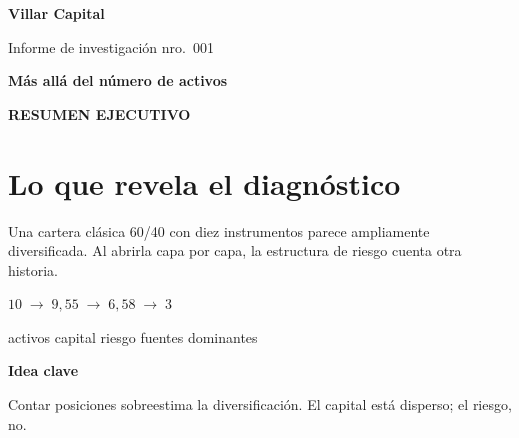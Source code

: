\documentclass[11pt,letterpaper]{article}
\newcommand{\kicker}[1]{%
  {\sffamily\small\bfseries\color{Navy}\MakeUppercase{#1}}\par\vspace{0.35em}%
}
\newcommand{\insight}[1]{%
  \vspace{0.35em}%
  \noindent\colorbox{Soft}{%
    \parbox{\dimexpr\textwidth-2\fboxsep-1pt\relax}{%
      \vspace{0.45em}%
      {\sffamily\bfseries\color{Navy} Idea clave}\par\vspace{0.2em}%
      {\large\color{Ink}#1}%
      \vspace{0.4em}%
    }%
  }\par\vspace{0.4em}%
}
\begin{document}
\begin{titlepage}
\thispagestyle{empty}

\vfill

\begin{center}
{\sffamily\Large\bfseries\color{Navy} Villar Capital}

\vspace{1.1em}
{\sffamily\small\color{Muted} Informe de investigación nro.\ 001}

\vspace{2.8em}
{\fontsize{30}{36}\selectfont\bfseries\color{Ink}%
Más allá del número de activos\par}
\end{center}

\vfill

\noindent{\color{Navy}\rule{\textwidth}{2.5pt}}
\end{titlepage}

\newpage
\kicker{Resumen ejecutivo}
\section*{Lo que revela el diagnóstico}

Una cartera clásica 60/40 con diez instrumentos parece ampliamente diversificada.
Al abrirla capa por capa, la estructura de riesgo cuenta otra historia.

\vspace{1.0em}
\begin{center}
{\LARGE\color{Ink}
$10 \;\rightarrow\; 9{,}55 \;\rightarrow\; 6{,}58 \;\rightarrow\; 3$
\par}
\vspace{0.45em}
{\sffamily\small\color{Muted}
activos \quad capital \quad riesgo \quad fuentes dominantes
}
\end{center}

\vspace{1.0em}
\insight{Contar posiciones sobreestima la diversificación. El capital está disperso; el riesgo, no.}
\end{document}
